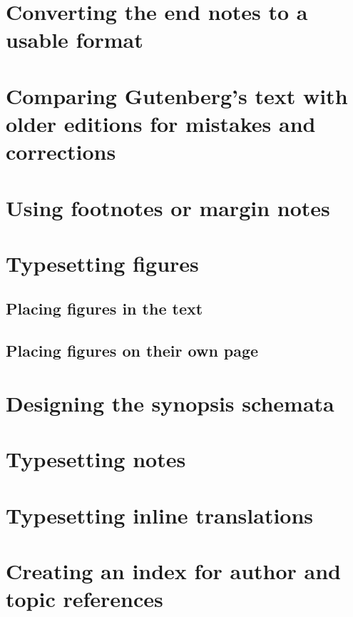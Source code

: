 \documentclass[16pt,letter,oneside,usenames,dvipsnames]{memoir}
\begin{document}
\chapter{Converting the end notes to a usable format}

\chapter{Comparing Gutenberg's text with older editions for mistakes and corrections}

\chapter{Using footnotes or margin notes}

\chapter{Typesetting figures}\label{ch:figures}
\skelpar

\section{Placing figures in the text}
\skelpar

\section{Placing figures on their own page}
\skelpar

\chapter{Designing the synopsis schemata}

\chapter{Typesetting notes}

\chapter{Typesetting inline translations}

\chapter{Creating an index for author and topic references}
\end{document}
